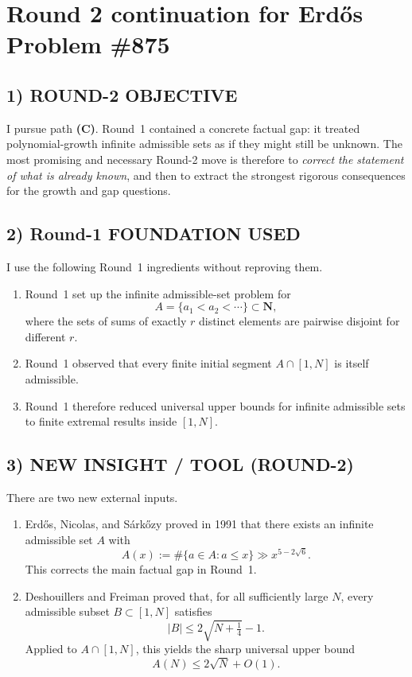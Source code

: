 \section{Round 2 continuation for Erd\H{o}s Problem \#875}

\subsection*{1) ROUND-2 OBJECTIVE}

I pursue path \textbf{(C)}. Round~1 contained a concrete factual gap: it treated polynomial-growth infinite admissible sets as if they might still be unknown. The most promising and necessary Round-2 move is therefore to \emph{correct the statement of what is already known}, and then to extract the strongest rigorous consequences for the growth and gap questions.

\subsection*{2) Round-1 FOUNDATION USED}

I use the following Round~1 ingredients without reproving them.

\begin{enumerate}
\item Round~1 set up the infinite admissible-set problem for
\[
A=\{a_1<a_2<\cdots\}\subset \mathbf{N},
\]
where the sets of sums of exactly \(r\) distinct elements are pairwise disjoint for different \(r\).
\item Round~1 observed that every finite initial segment \(A\cap [1,N]\) is itself admissible.
\item Round~1 therefore reduced universal upper bounds for infinite admissible sets to finite extremal results inside \([1,N]\).
\end{enumerate}

\subsection*{3) NEW INSIGHT / TOOL (ROUND-2)}

There are two new external inputs.

\begin{enumerate}
\item Erd\H{o}s, Nicolas, and S\'ark\H{o}zy proved in 1991 that there exists an infinite admissible set \(A\) with
\[
A(x):=\#\{a\in A:a\le x\}\gg x^{5-2\sqrt 6}.
\]
This corrects the main factual gap in Round~1.
\item Deshouillers and Freiman proved that, for all sufficiently large \(N\), every admissible subset \(B\subset [1,N]\) satisfies
\[
|B|\le 2\sqrt{N+\tfrac14}-1.
\]
Applied to \(A\cap [1,N]\), this yields the sharp universal upper bound
\[
A(N)\le 2\sqrt N+O(1).
\]
\end{enumerate}

